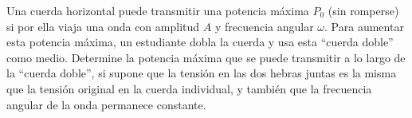 \item Una cuerda horizontal puede transmitir una potencia máxima $P_0$ (sin romperse) si por ella viaja una onda con amplitud $A$ y frecuencia angular $\omega$. Para aumentar esta potencia máxima, un estudiante dobla la cuerda y usa esta “cuerda doble” como medio. Determine la potencia máxima que se puede transmitir a lo largo de la “cuerda doble”, si supone que la tensión en las dos hebras juntas es la misma que la tensión original en la cuerda individual, y también que la frecuencia angular de la onda permanece constante.
